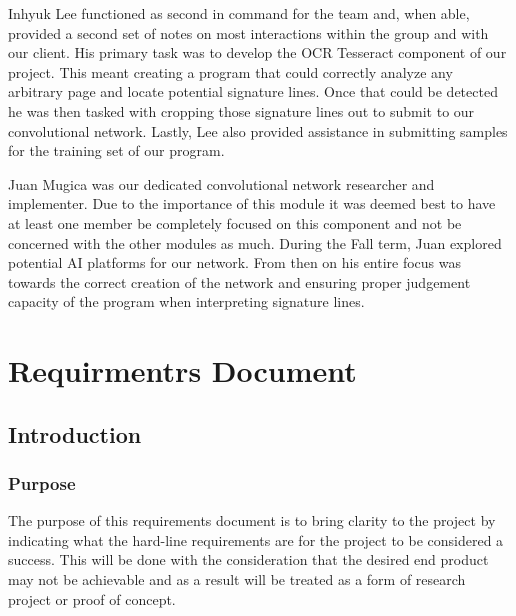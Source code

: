 \documentclass[article, onecolumn, draftclsnofoot,10pt, compsoc]{IEEEtran}
\begin{document}
Inhyuk Lee functioned as second in command for the team and, when able, provided a second set of notes on most interactions within the group and with our client. His primary task was to develop the OCR Tesseract component of our project. This meant creating a program that could correctly analyze any arbitrary page and locate potential signature lines. Once that could be detected he was then tasked with cropping those signature lines out to submit to our convolutional network. Lastly, Lee also provided assistance in submitting samples for the training set of our program.

Juan Mugica was our dedicated convolutional network researcher and implementer. Due to the importance of this module it was deemed best to have at least one member be completely focused on this component and not be concerned with the other modules as much. During the Fall term, Juan explored potential AI platforms for our network. From then on his entire focus was towards the correct creation of the network and ensuring proper judgement capacity of the program when interpreting signature lines.

\section{Requirmentrs Document}
\subsection{Introduction}
\subsubsection{Purpose}
The purpose of this requirements document is to bring clarity to the project by indicating what the hard-line requirements are for the project to be considered a success. This will be done with the consideration that the desired end product may not be achievable and as a result will be treated as a form of research project or proof of concept.
\end{document}
